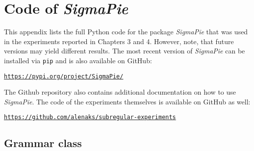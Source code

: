 \newpage

\chapter{Code of \emph{SigmaPie}}

This appendix lists the full Python code for the package \emph{SigmaPie} that was used in the experiments reported in Chapters 3 and 4.
However, note, that future versions may yield different results.
The most recent version of \emph{SigmaPie} can be installed
via \texttt{pip} and is also available on GitHub:

\begin{center}
\href{https://pypi.org/project/SigmaPie/}{\texttt{https://pypi.org/project/SigmaPie/}}
\end{center}

The Github repository also contains additional documentation on how to use \emph{SigmaPie}.
The code of the experiments themselves is available on GitHub as well:

\begin{center}
\href{https://github.com/alenaks/subregular-experiments}{\texttt{https://github.com/alenaks/subregular-experiments}}
\end{center}

\section{Grammar class}

